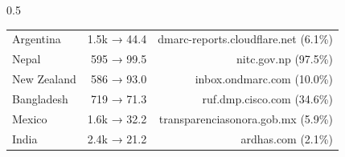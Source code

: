 \begin{table}[ht]
\begin{subtable}[t]{0.5\textwidth}
\begin{tabular}{lrr}
    Argentina      & 1.5k → 44.4  & dmarc-reports.cloudflare.net (6.1\%) \\
    Nepal          & 595 → 99.5   & nitc.gov.np (97.5\%) \\
    New Zealand    & 586 → 93.0   & inbox.ondmarc.com (10.0\%) \\
    Bangladesh     & 719 → 71.3   & ruf.dmp.cisco.com (34.6\%) \\
    Mexico         & 1.6k → 32.2  & transparenciasonora.gob.mx (5.9\%) \\
    India          & 2.4k → 21.2  & ardhas.com (2.1\%) \\
    \bottomrule
    \end{tabular}
  \end{subtable}
  \label{tab:combined_top_reporting_countries_and_top_report_receiver}
  \vspace{-15px}
\end{table}
